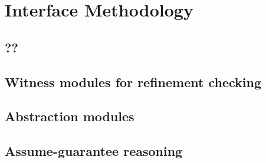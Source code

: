 \chapter {Interface Methodology}
\section{??}
\section{Witness modules for refinement checking}
\section{Abstraction modules}
\section{Assume-guarantee reasoning}
